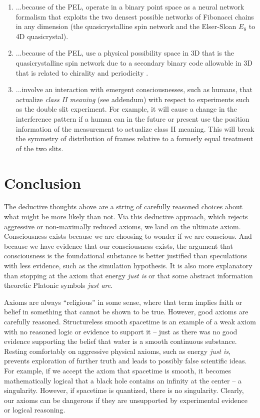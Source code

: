 \documentclass[submission,copyright,creativecommons]{eptcs}
\begin{document}
\begin{enumerate}
  \item ...because of the PEL, operate in a binary point space as a neural network formalism that exploits the two densest possible networks of Fibonacci chains in any dimension (the quasicrystalline spin network and the Elser-Sloan $E_{8}$ to 4D quasicrystal).\\
  \item ...because of the PEL, use a physical possibility space in 3D that is the quasicrystalline spin network due to a secondary binary code allowable in 3D that is related to chirality and periodicity \cite{sadler2013periodic}.\\
  \item ...involve an interaction with emergent consciousnesses, such as humans, that actualize \textit{class II meaning} (see addendum) with respect to experiments such as the double slit experiment. For example, it will cause a change in the interference pattern if a human can in the future or present use the position information of the measurement to actualize class II meaning. This will break the symmetry of distribution of frames relative to a formerly equal treatment of the two slits.\\

\end{enumerate}

\section{Conclusion}
\label{sec:12}

The deductive thoughts above are a string of carefully reasoned choices about what might be more likely than not. Via this deductive approach, which rejects aggressive or non-maximally reduced axioms, we land on the ultimate axiom. Consciousness exists because we are choosing to wonder if we are conscious. And because we have evidence that our consciousness exists, the argument that consciousness is the foundational substance is better justified than speculations with less evidence, such as the simulation hypothesis. It is also more explanatory than stopping at the axiom that energy \textit{just is} or that some abstract information theoretic Platonic symbols \textit{just are}.

Axioms are always “religious” in some sense, where that term implies faith or belief in something that cannot be shown to be true. However, good axioms are carefully reasoned. Structureless smooth spacetime is an example of a weak axiom with no reasoned logic or evidence to support it -- just as there was no good evidence supporting the belief that water is a smooth continuous substance. Resting comfortably on aggressive physical axioms, such as energy \textit{just is}, prevents exploration of further truth and leads to possibly false scientific ideas. For example, if we accept the axiom that spacetime is smooth, it becomes mathematically logical that a black hole contains an infinity at the center -- a singularity. However, if spacetime is quantized, there is no singularity. Clearly, our axioms can be dangerous if they are unsupported by experimental evidence or logical reasoning.
\end{document}
